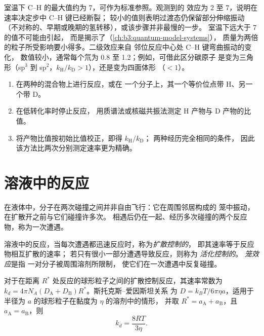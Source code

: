 室温下 C--H 的最大值约为 7，可作为标准参照。观测到的
效应为 2 至 7，说明在速率决定步中 C--H 键已经断裂；
较小的值则表明过渡态仍保留部分伸缩振动
（不对称的、早期或晚期的氢转移），或该步骤并非最慢的一步。
室温下远大于 7 的值不可能由引起，
而是揭示了（\cref{ch:b3:quantum-model-systems}），
质量为两倍的粒子所受影响要小得多。二级效应来自
邻位反应中心处 C--H 键弯曲振动的变化，
数值较小，通常每个氘为 0.8 至 1.2；例如，可借此区分碳原子
是变为三角形（sp$^3$ 到 sp$^2$，$k_{\mathrm H}/k_{\mathrm D} > 1$），还是变为四面体形
（$< 1$）。

\begin{method}[通过竞争法测量动力学同位素效应]\label{met:b3:rate-theories:kie}
\begin{enumerate}
  \item 在两种的混合物上进行反应，或在
        一个分子上，其一个等价位点带 H、另一个带 D。
  \item 在低转化率时停止反应，
        用质谱法或核磁共振法测定 H 产物与 D 产物的比值。
  \item 将产物比值按初始比值校正，即得 $k_{\mathrm H}/k_{\mathrm D}$；
        两种经历完全相同的条件，
        因此该方法比两次分别测定速率更为精确。
\end{enumerate}
\end{method}

\section{溶液中的反应}

在液体中，分子在两次碰撞之间并非自由飞行：它在周围邻居构成的
笼中振动，在扩散开之前与它们碰撞许多次。
相遇后仍在一起、经历多次碰撞的两个反应物，称为一次遭遇。

\begin{definition}\label{def:b3:rate-theories:diffusion}
溶液中的反应，当每次遭遇都迅速反应时，称为\emph{扩散控制的}，
即其速率等于反应物相互扩散的速率；
若只有很小一部分遭遇导致反应，则称为
\emph{活化控制的}。
\emph{笼效应}是指
一对分子被周围溶剂所限制，
使它们在一次遭遇中反复碰撞。
\end{definition}

\begin{proposition}[斯莫卢霍夫斯基极限]\label{prop:b3:rate-theories:smoluchowski}
对于在距离 $R^*$ 处反应的球形粒子之间的扩散控制反应，其速率常数为
$k_d = 4\pi N_A(D_{\mathrm A} + D_{\mathrm B})R^*$。斯托克斯–爱因斯坦关系
为 $D = k_BT/6\pi\eta a$，适用于半径为 $a$ 的球形粒子在黏度为 $\eta$ 的溶剂中的情形，
并取 $R^* = a_{\mathrm A} + a_{\mathrm B}$，且 $a_{\mathrm A} = a_{\mathrm B}$，则
\[
  k_d = \frac{8RT}{3\eta} .
\]
\end{proposition}

